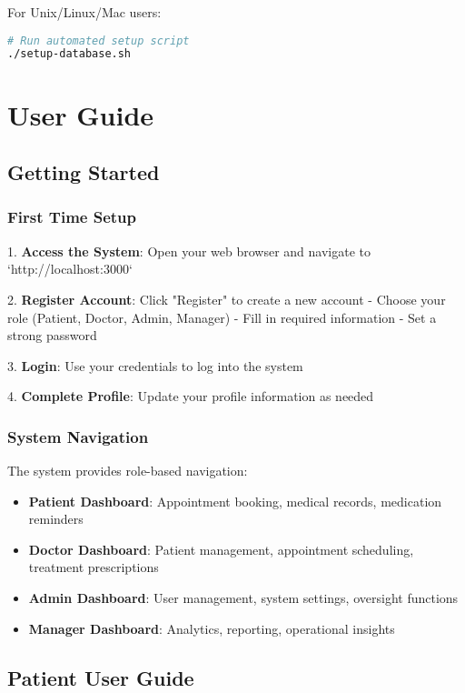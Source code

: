 \documentclass[12pt,a4paper]{article}
\begin{document}
For Unix/Linux/Mac users:

\begin{lstlisting}[language=bash, caption=Automated Setup]
# Run automated setup script
./setup-database.sh
\end{lstlisting}

\section{User Guide}

\subsection{Getting Started}

\subsubsection{First Time Setup}

1. \textbf{Access the System}: Open your web browser and navigate to `http://localhost:3000`

2. \textbf{Register Account}: Click "Register" to create a new account
   - Choose your role (Patient, Doctor, Admin, Manager)
   - Fill in required information
   - Set a strong password

3. \textbf{Login}: Use your credentials to log into the system

4. \textbf{Complete Profile}: Update your profile information as needed

\subsubsection{System Navigation}

The system provides role-based navigation:

\begin{itemize}
    \item \textbf{Patient Dashboard}: Appointment booking, medical records, medication reminders
    \item \textbf{Doctor Dashboard}: Patient management, appointment scheduling, treatment prescriptions
    \item \textbf{Admin Dashboard}: User management, system settings, oversight functions
    \item \textbf{Manager Dashboard}: Analytics, reporting, operational insights
\end{itemize}

\subsection{Patient User Guide}
\end{document}
